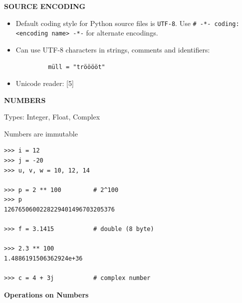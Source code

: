 \documentclass[9pt,a4wide]{extarticle}
\begin{document}
\medskip

\bigskip
{\large\bf SOURCE ENCODING}

\begin{itemize}

\item Default coding style for Python source files is {\tt UTF-8}. Use
    {\tt \# -*- coding: <encoding name> -*-} for alternate encodings.

\item Can use UTF-8 characters in strings, comments and identifiers:

\begin{verbatim}
         müll = "trööööt"    
\end{verbatim}
 
\item Unicode reader: [5] 

\end{itemize}



\bigskip
{\LARGE\bf NUMBERS}

Types: Integer, Float, Complex

Numbers are immutable

\begin{verbatim}
>>> i = 12
>>> j = -20
>>> u, v, w = 10, 12, 14

>>> p = 2 ** 100         # 2^100
>>> p
1267650600228229401496703205376

>>> f = 3.1415           # double (8 byte)

>>> 2.3 ** 100
1.4886191506362924e+36

>>> c = 4 + 3j           # complex number
\end{verbatim}



\medskip
{\bf Operations on Numbers}

\medskip
\end{document}
